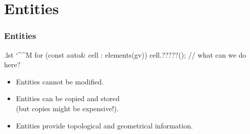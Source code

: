 \documentclass[ignorenonframetext,11pt]{beamer}
\makeatletter
\theoremstyle{definition}
\newenvironment{codeblock}{%
  \begin{tcolorbox}[size=small,oversize,boxrule=0pt,colframe=white]}{%
  \end{tcolorbox}}
\newenvironment{cppcode}{%
  \begingroup
  \@bsphack
  \immediate\openout\lstvrb@out\jobname.lst
  \let\do\@makeother\dospecials\catcode`\^^M\active
  \def\verbatim@processline{%
    \immediate\write\lstvrb@out{\the\verbatim@line}}%
  \verbatim@start}{%
  \immediate\closeout\lstvrb@out
  \@esphack
  \endgroup
  \begin{codeblock}
    
  \end{codeblock}}
\makeatother
\begin{document}


\section{Entities}

\begin{frame}[fragile] \frametitle{Entities}


  \begin{cppcode}
    for (const auto& cell : elements(gv)) {
      cell.?????(); // what can we do here?
    }
  \end{cppcode}

  \pause
  \begin{itemize}
  \item Entities cannot be modified.
  \item Entities can be copied and stored\\(but copies might be expensive!).
    \pause
  \item Entities provide topological and geometrical information.
  \end{itemize}
\end{frame}
\end{document}
